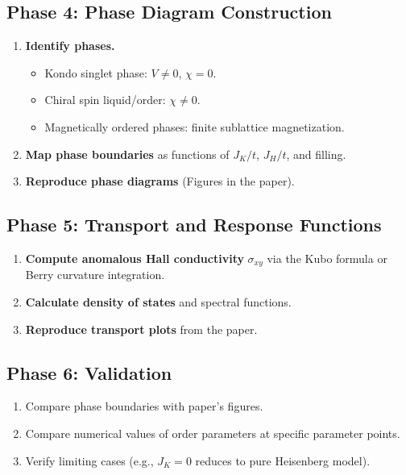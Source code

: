 \documentclass[11pt,a4paper]{article}
\begin{document}
\subsection{Phase 4: Phase Diagram Construction}
\begin{enumerate}[label=\textbf{4.\arabic*}]
  \item \textbf{Identify phases.}
    \begin{itemize}
      \item Kondo singlet phase: $V \neq 0$, $\chi = 0$.
      \item Chiral spin liquid/order: $\chi \neq 0$.
      \item Magnetically ordered phases: finite sublattice magnetization.
    \end{itemize}
  \item \textbf{Map phase boundaries} as functions of $J_K/t$, $J_H/t$, and filling.
  \item \textbf{Reproduce phase diagrams} (Figures in the paper).
\end{enumerate}

\subsection{Phase 5: Transport and Response Functions}
\begin{enumerate}[label=\textbf{5.\arabic*}]
  \item \textbf{Compute anomalous Hall conductivity} $\sigma_{xy}$ via the Kubo formula or Berry curvature integration.
  \item \textbf{Calculate density of states} and spectral functions.
  \item \textbf{Reproduce transport plots} from the paper.
\end{enumerate}

\subsection{Phase 6: Validation}
\begin{enumerate}[label=\textbf{6.\arabic*}]
  \item Compare phase boundaries with paper's figures.
  \item Compare numerical values of order parameters at specific parameter points.
  \item Verify limiting cases (e.g., $J_K = 0$ reduces to pure Heisenberg model).
\end{enumerate}

\end{document}
